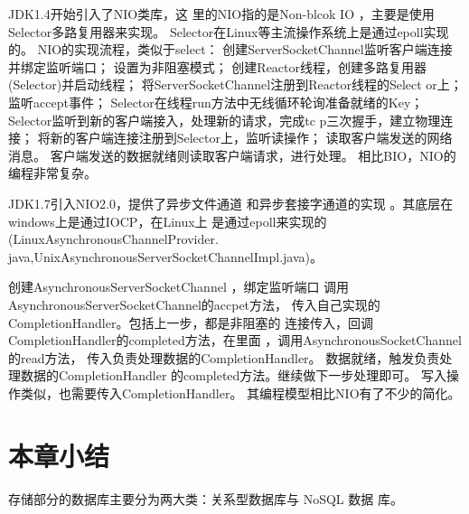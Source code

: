 JDK1.4开始引入了NIO类库，这
里的NIO指的是Non-blcok IO
，主要是使用Selector多路复用器来实现。
Selector在Linux等主流操作系统上是通过epoll实现的。
NIO的实现流程，类似于select：
创建ServerSocketChannel监听客户端连接并绑定监听端口；
设置为非阻塞模式；
创建Reactor线程，创建多路复用器(Selector)并启动线程；
将ServerSocketChannel注册到Reactor线程的Select
or上；监听accept事件；
Selector在线程run方法中无线循环轮询准备就绪的Key；
Selector监听到新的客户端接入，处理新的请求，完成tc
p三次握手，建立物理连接；
将新的客户端连接注册到Selector上，监听读操作；
读取客户端发送的网络消息。
客户端发送的数据就绪则读取客户端请求，进行处理。
相比BIO，NIO的编程非常复杂。

JDK1.7引入NIO2.0，提供了异步文件通道
和异步套接字通道的实现
。其底层在windows上是通过IOCP，在Linux上
是通过epoll来实现的
(LinuxAsynchronousChannelProvider.
java,UnixAsynchronousServerSocketChannelImpl.java)。

创建AsynchronousServerSocketChannel
，绑定监听端口
调用AsynchronousServerSocketChannel的accpet方法，
传入自己实现的CompletionHandler。包括上一步，都是非阻塞的
连接传入，回调CompletionHandler的completed方法，在里面
，调用AsynchronousSocketChannel的read方法，
传入负责处理数据的CompletionHandler。
数据就绪，触发负责处理数据的CompletionHandler
的completed方法。继续做下一步处理即可。
写入操作类似，也需要传入CompletionHandler。
其编程模型相比NIO有了不少的简化。
\section{本章小结}
存储部分的数据库主要分为两大类：关系型数据库与 NoSQL 数据
库。